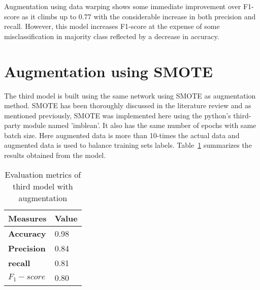 Augmentation using data warping shows some immediate improvement over F1-score as it climbs up to 0.77 with the considerable increase in both precision and recall. However, this model increases F1-score at the expense of some misclassification in majority class reflected by a decrease in accuracy.   

\section{Augmentation using SMOTE}  
The third model is built using the same network using SMOTE as augmentation method. SMOTE has been thoroughly discussed in the literature review and as mentioned previously, SMOTE was implemented here using the python's third-party module named 'imblean'. It also has the same number of epochs with same batch size. Here augmented data is more than 10-times the actual data and augmented data is used to balance training sets labels.
Table~\ref{table:model3_result} summarizes the results obtained from the model.

\begin{table}[ht]
	\centering
	\caption{Evaluation metrics of third model with augmentation}
	\label{table:model3_result}
	\begin{tabular}{|p{2cm}|p{2cm}|} 
		\hline
		\textbf{Measures} & \textbf{Value}\\ 
		\hline %
		\textbf{Accuracy} & 0.98  \\ 
		\textbf{Precision} & 0.84  \\ 
		
		\textbf{recall} & 0.81 \\ 
		
		\textbf{\textbf{$F_1-score$}} & 0.80 \\ 
		
		\hline		
	\end{tabular} %
	
\end{table} %

